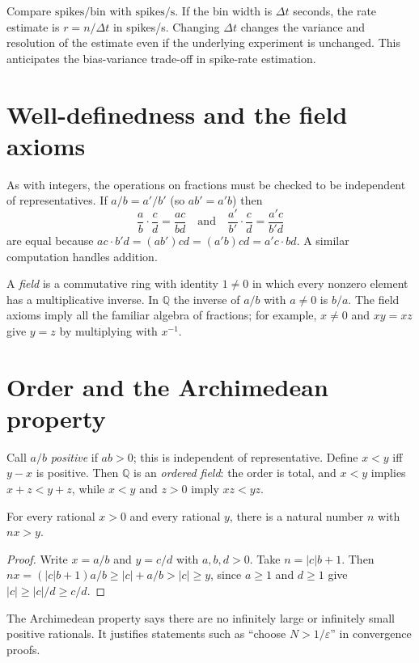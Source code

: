 \begin{workedexample}
Compare $\mathrm{spikes}/\mathrm{bin}$ with $\mathrm{spikes}/\mathrm{s}$. If the bin width is $\Delta t$ seconds, the rate estimate is $r=n/\Delta t$ in spikes/s. Changing $\Delta t$ changes the variance and resolution of the estimate even if the underlying experiment is unchanged. This anticipates the bias-variance trade-off in spike-rate estimation.
\end{workedexample}
\section{Well-definedness and the field axioms}
As with integers, the operations on fractions must be checked to be independent of representatives. If $a/b=a'/b'$ (so $ab'=a'b$) then
\[
\frac ab\cdot\frac cd=\frac{ac}{bd}\quad\text{and}\quad\frac{a'}{b'}\cdot\frac cd=\frac{a'c}{b'd}
\]
are equal because $ac\cdot b'd=(ab')cd=(a'b)cd=a'c\cdot bd$. A similar computation handles addition.

A \emph{field} is a commutative ring with identity $1\ne0$ in which every nonzero element has a multiplicative inverse. In $\mathbb Q$ the inverse of $a/b$ with $a\ne0$ is $b/a$. The field axioms imply all the familiar algebra of fractions; for example, $x\ne0$ and $xy=xz$ give $y=z$ by multiplying with $x^{-1}$.

\section{Order and the Archimedean property}
Call $a/b$ \emph{positive} if $ab>0$; this is independent of representative. Define $x<y$ iff $y-x$ is positive. Then $\mathbb Q$ is an \emph{ordered field}: the order is total, and $x<y$ implies $x+z<y+z$, while $x<y$ and $z>0$ imply $xz<yz$.

\begin{proposition}
For every rational $x>0$ and every rational $y$, there is a natural number $n$ with $nx>y$.
\end{proposition}
\begin{proof}
Write $x=a/b$ and $y=c/d$ with $a,b,d>0$. Take $n=|c|b+1$. Then $nx=(|c|b+1)a/b\ge|c|+a/b>|c|\ge y$, since $a\ge1$ and $d\ge1$ give $|c|\ge|c|/d\ge c/d$.
\end{proof}
The Archimedean property says there are no infinitely large or infinitely small positive rationals. It justifies statements such as ``choose $N>1/\varepsilon$'' in convergence proofs.

